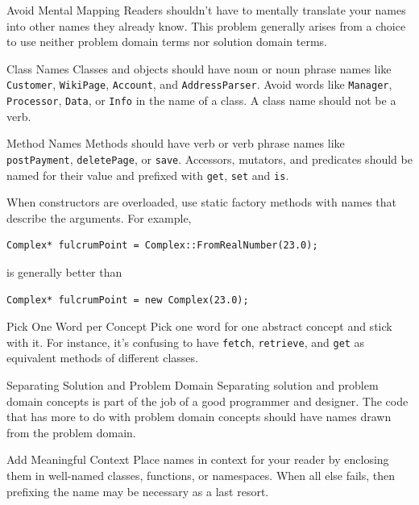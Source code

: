 \documentclass{beamer}
\begin{document}
\begin{frame}{Avoid Mental Mapping}
Readers shouldn’t have to mentally translate your names into other names they
already know. This problem generally arises from a choice to use neither problem
domain terms nor solution domain terms.
\end{frame}

\begin{frame}[fragile]{Class Names}
Classes and objects should have noun or noun phrase names like
\lstinline{Customer}, \lstinline{WikiPage}, \lstinline{Account}, and
\lstinline{AddressParser}. Avoid words like \lstinline{Manager},
\lstinline{Processor}, \lstinline{Data}, or \lstinline{Info} in the name of a
class. A class name should not be a verb.
\end{frame}

\begin{frame}[fragile]{Method Names}
Methods should have verb or verb phrase names like \lstinline{postPayment},
\lstinline{deletePage}, or \lstinline{save}. Accessors, mutators, and predicates
should be named for their value and prefixed with \lstinline{get},
\lstinline{set} and \lstinline{is}.


When constructors are overloaded, use static factory methods with names that
describe the arguments. For example,
\begin{lstlisting}
Complex* fulcrumPoint = Complex::FromRealNumber(23.0);
\end{lstlisting}
is generally better than
\begin{lstlisting}
Complex* fulcrumPoint = new Complex(23.0);
\end{lstlisting}
\end{frame}

\begin{frame}{Pick One Word per Concept}
Pick one word for one abstract concept and stick with it. For instance, it’s
confusing to have \lstinline{fetch}, \lstinline{retrieve}, and \lstinline{get}
as equivalent methods of different classes.
\end{frame}

\begin{frame}{Separating Solution and Problem Domain}
Separating solution and problem domain concepts is part of the job of a good
programmer and designer. The code that has more to do with problem domain
concepts should have names drawn from the problem domain.
\end{frame}

\begin{frame}{Add Meaningful Context}
Place names in context for your reader by enclosing them in well-named classes,
functions, or namespaces. When all else fails, then prefixing the name may be
necessary as a last resort. 
\end{frame}
\end{document}
